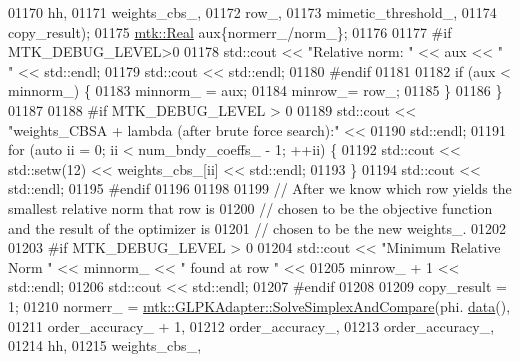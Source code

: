 \begin{DoxyCode}
{{01170                                                           hh,
01171                                                           weights\_cbs\_,
01172                                                           row\_,
01173                                                           mimetic\_threshold\_,
01174                                                           copy\_result);
01175       \hyperlink{group__c01-roots_gac080bbbf5cbb5502c9f00405f894857d}{mtk::Real} aux\{normerr\_/norm\_\};
01176 
01177 \textcolor{preprocessor}{      #if MTK\_DEBUG\_LEVEL>0}
01178       std::cout << \textcolor{stringliteral}{"Relative norm: "} << aux << \textcolor{stringliteral}{" "} << std::endl;
01179       std::cout << std::endl;
01180 \textcolor{preprocessor}{      #endif}
01181 
01182       \textcolor{keywordflow}{if} (aux < minnorm\_) \{
01183         minnorm\_ = aux;
01184         minrow\_= row\_;
01185       \}
01186     \}
01187 
01188 \textcolor{preprocessor}{    #if MTK\_DEBUG\_LEVEL > 0}
01189     std::cout << \textcolor{stringliteral}{"weights\_CBSA + lambda (after brute force search):"} <<
01190       std::endl;
01191     \textcolor{keywordflow}{for} (\textcolor{keyword}{auto} ii = 0; ii < num\_bndy\_coeffs\_ - 1; ++ii) \{
01192       std::cout << std::setw(12) << weights\_cbs\_[ii] << std::endl;
01193     \}
01194     std::cout << std::endl;
01195 \textcolor{preprocessor}{    #endif}
01196 
01198 
01199     \textcolor{comment}{// After we know which row yields the smallest relative norm that row is}
01200     \textcolor{comment}{// chosen to be the objective function and the result of the optimizer is}
01201     \textcolor{comment}{// chosen to be the new weights\_.}
01202 
01203 \textcolor{preprocessor}{    #if MTK\_DEBUG\_LEVEL > 0}
01204     std::cout << \textcolor{stringliteral}{"Minimum Relative Norm "} << minnorm\_ << \textcolor{stringliteral}{" found at row "} <<
01205       minrow\_ + 1 << std::endl;
01206     std::cout << std::endl;
01207 \textcolor{preprocessor}{    #endif}
01208 
01209     copy\_result = 1;
01210     normerr\_ = \hyperlink{classmtk_1_1GLPKAdapter_a834480aca83e3c0d09fdab7fdb7e8a3f}{mtk::GLPKAdapter::SolveSimplexAndCompare}(phi.
      \hyperlink{classmtk_1_1DenseMatrix_a16b3ff56feb2658b9fc7147d1de4d8e7}{data}(),
01211                                                         order\_accuracy\_ + 1,
01212                                                         order\_accuracy\_,
01213                                                         order\_accuracy\_,
01214                                                         hh,
01215                                                         weights\_cbs\_,
}}
\end{DoxyCode}
